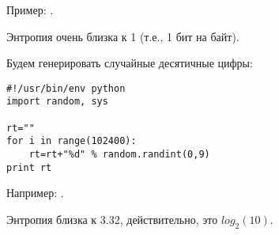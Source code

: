 Пример: .

Энтропия очень близка к 1 (т.е., 1 бит на байт).

Будем генерировать случайные десятичные цифры:

\begin{lstlisting}[style=custompy]
#!/usr/bin/env python
import random, sys

rt=""
for i in range(102400):
    rt=rt+"%d" % random.randint(0,9)
print rt
\end{lstlisting}

Например: .

Энтропия близка к 3.32, действительно, это $log_2(10)$.

